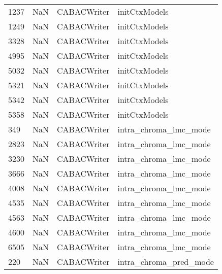 \begin{tabular}{llll}
1237 &                   NaN &                CABACWriter &                             initCtxModels \\
1249 &                   NaN &                CABACWriter &                             initCtxModels \\
3328 &                   NaN &                CABACWriter &                             initCtxModels \\
4995 &                   NaN &                CABACWriter &                             initCtxModels \\
5032 &                   NaN &                CABACWriter &                             initCtxModels \\
5321 &                   NaN &                CABACWriter &                             initCtxModels \\
5342 &                   NaN &                CABACWriter &                             initCtxModels \\
5358 &                   NaN &                CABACWriter &                             initCtxModels \\
349  &                   NaN &                CABACWriter &                     intra\_chroma\_lmc\_mode \\
2823 &                   NaN &                CABACWriter &                     intra\_chroma\_lmc\_mode \\
3230 &                   NaN &                CABACWriter &                     intra\_chroma\_lmc\_mode \\
3666 &                   NaN &                CABACWriter &                     intra\_chroma\_lmc\_mode \\
4008 &                   NaN &                CABACWriter &                     intra\_chroma\_lmc\_mode \\
4535 &                   NaN &                CABACWriter &                     intra\_chroma\_lmc\_mode \\
4563 &                   NaN &                CABACWriter &                     intra\_chroma\_lmc\_mode \\
4600 &                   NaN &                CABACWriter &                     intra\_chroma\_lmc\_mode \\
6505 &                   NaN &                CABACWriter &                     intra\_chroma\_lmc\_mode \\
220  &                   NaN &                CABACWriter &                    intra\_chroma\_pred\_mode \\

\end{tabular}
